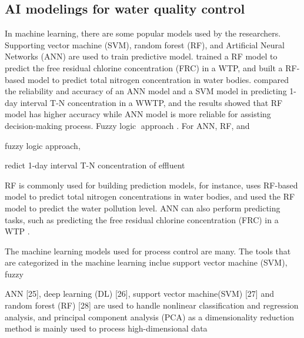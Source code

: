 \subsection{AI modelings for water quality control}
In machine learning, there are some popular models used by the researchers. Supporting vector machine (SVM), random forest (RF), and Artificial Neural Networks (ANN) are used to train predictive model. \citet{librantzArtificialNeuralNetworks2018} trained a RF model to predict the free residual chlorine concentration (FRC) in a WTP, and \citet{xuAlternativeLaboratoryTesting2021} built a RF-based model to predict total nitrogen concentration in water bodies. \citet{guoPredictionEffluentConcentration2015} compared the reliability and accuracy of an ANN model and a SVM model in predicting 1-day interval T-N concentration in a WWTP, and the results showed that RF model has higher accuracy while ANN model is more reliable for assisting decision-making process. Fuzzy logic approach 
. For ANN, RF, and 

fuzzy logic approach, 

redict 1-day interval T-N concentration of effluent

RF is commonly used for building prediction models, for instance, \citet{xuAlternativeLaboratoryTesting2021} uses RF-based model to predict total nitrogen concentrations in water bodies, and \citet{bulacanstateuniversitycityofmalolosbulacanphilippines.heisalsowithamauniversityquezoncityphilippinesPredictingRiverPollution2020} used the RF model to predict the water pollution level. ANN can also perform predicting tasks, such as predicting the free residual chlorine concentration (FRC) in a WTP \citep{librantzArtificialNeuralNetworks2018}. 



The machine learning models used for process control are many. The tools that are categorized in the machine learning inclue support vector machine (SVM), fuzzy 

ANN [25], deep learning (DL) [26], support vector machine(SVM) [27] and random forest (RF) [28] are used to handle nonlinear classification and regression analysis, and principal component analysis (PCA) as a dimensionality reduction method is mainly used to process high-dimensional data


